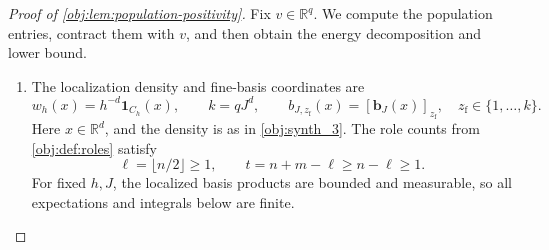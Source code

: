 \begin{proof}[Proof of \cref{obj:lem:population-positivity}]
Fix \(v\in\mathbb R^q\). We compute the population entries, contract them with \(v\), and then obtain the energy decomposition and lower bound.

\begin{enumerate}
\item The localization density and fine-basis coordinates are
\[
w_h(x)=h^{-d}\mathbf 1_{C_h}(x),
\qquad
k=qJ^d,
\qquad
b_{J,z_{\mathrm f}}(x)=[\mathbf b_J(x)]_{z_{\mathrm f}},
\quad z_{\mathrm f}\in\{1,\ldots,k\}.
\]
Here \(x\in\mathbb R^d\), and the density is as in
\cref{obj:synth_3}. The role counts from \cref{obj:def:roles} satisfy
\[
\ell=\lfloor n/2\rfloor\ge1,
\qquad
t=n+m-\ell\ge n-\ell\ge1.
\]
For fixed \(h,J\), the localized basis products are bounded and measurable, so all expectations and integrals below are finite.


\end{enumerate}
\end{proof}
